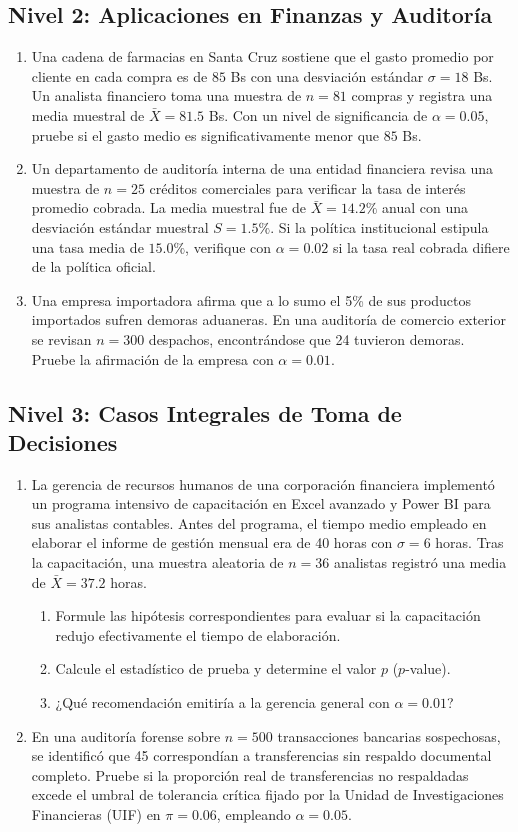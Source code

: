 \subsection*{Nivel 2: Aplicaciones en Finanzas y Auditoría}
\begin{enumerate}[resume]
    \item Una cadena de farmacias en Santa Cruz sostiene que el gasto promedio por cliente en cada compra es de $85$ Bs con una desviación estándar $\sigma = 18$ Bs. Un analista financiero toma una muestra de $n = 81$ compras y registra una media muestral de $\bar{X} = 81.5$ Bs. Con un nivel de significancia de $\alpha = 0.05$, pruebe si el gasto medio es significativamente menor que $85$ Bs.
    \item Un departamento de auditoría interna de una entidad financiera revisa una muestra de $n = 25$ créditos comerciales para verificar la tasa de interés promedio cobrada. La media muestral fue de $\bar{X} = 14.2\%$ anual con una desviación estándar muestral $S = 1.5\%$. Si la política institucional estipula una tasa media de $15.0\%$, verifique con $\alpha = 0.02$ si la tasa real cobrada difiere de la política oficial.
    \item Una empresa importadora afirma que a lo sumo el 5\% de sus productos importados sufren demoras aduaneras. En una auditoría de comercio exterior se revisan $n = 300$ despachos, encontrándose que 24 tuvieron demoras. Pruebe la afirmación de la empresa con $\alpha = 0.01$.
\end{enumerate}

\subsection*{Nivel 3: Casos Integrales de Toma de Decisiones}
\begin{enumerate}[resume]
    \item La gerencia de recursos humanos de una corporación financiera implementó un programa intensivo de capacitación en Excel avanzado y Power BI para sus analistas contables. Antes del programa, el tiempo medio empleado en elaborar el informe de gestión mensual era de 40 horas con $\sigma = 6$ horas. Tras la capacitación, una muestra aleatoria de $n = 36$ analistas registró una media de $\bar{X} = 37.2$ horas.
    \begin{enumerate}
        \item Formule las hipótesis correspondientes para evaluar si la capacitación redujo efectivamente el tiempo de elaboración.
        \item Calcule el estadístico de prueba y determine el valor $p$ ($p$-value).
        \item ¿Qué recomendación emitiría a la gerencia general con $\alpha = 0.01$?
    \end{enumerate}
    \item En una auditoría forense sobre $n = 500$ transacciones bancarias sospechosas, se identificó que 45 correspondían a transferencias sin respaldo documental completo. Pruebe si la proporción real de transferencias no respaldadas excede el umbral de tolerancia crítica fijado por la Unidad de Investigaciones Financieras (UIF) en $\pi = 0.06$, empleando $\alpha = 0.05$.
\end{enumerate}
